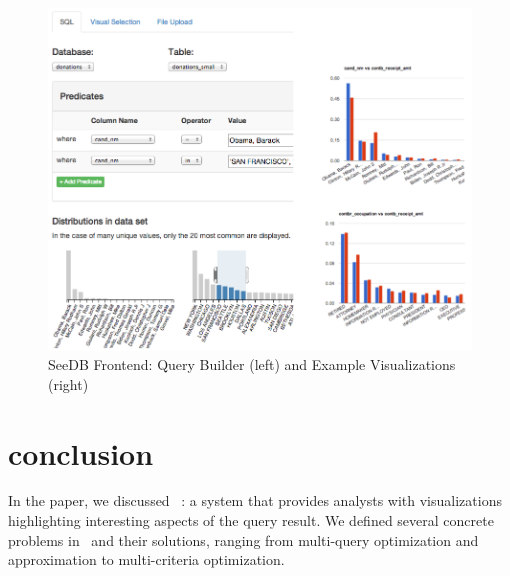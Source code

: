 \documentclass{sig-alternate}
\begin{document}



\begin{figure}[ht]
  \centering
  \includegraphics[width=\textwidth]{images/frontend}
  \caption{SeeDB Frontend: Query Builder (left) and Example Visualizations
(right)}
\label{fig:frontend1}
\end{figure}




% 
% 

% 

\section{conclusion}
\label{sec:related_work}

In the paper, we discussed \SeeDB\ : a system that provides analysts with visualizations highlighting interesting aspects of the query result. We defined several concrete problems in \SeeDB\ and their solutions, ranging from multi-query optimization and approximation to multi-criteria optimization. 
\end{document}
